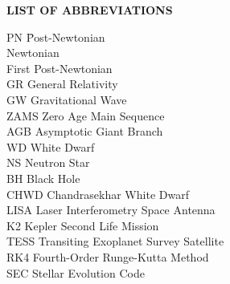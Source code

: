 {}

\begin{center}
{\large\textbf{LIST OF ABBREVIATIONS}}
\end{center}

\newcommand{\Ab}[2]{\noindent  #1 \> #2 \\}
\newcommand{\Abi}[2]{\noindent #1 \hspace{1.5cm} \= #2 \\}

\begin{tabbing}
\Abi{PN}{Post-Newtonian}
\Ab{}{Newtonian}
\Ab{}{First Post-Newtonian}
\Ab{GR}{General Relativity}
\Ab{GW}{Gravitational Wave}
\Ab{ZAMS}{Zero Age Main Sequence}
\Ab{AGB}{Asymptotic Giant Branch}
\Ab{WD}{White Dwarf}
\Ab{NS}{Neutron Star}
\Ab{BH}{Black Hole}
\Ab{CHWD}{Chandrasekhar White Dwarf}
\Ab{LISA}{Laser Interferometry Space Antenna}
\Ab{K2}{Kepler Second Life Mission}
\Ab{TESS}{Transiting Exoplanet Survey Satellite}
\Ab{RK4}{Fourth-Order Runge-Kutta Method}
\Ab{SEC}{Stellar Evolution Code}
\end{tabbing}

\clearpage
